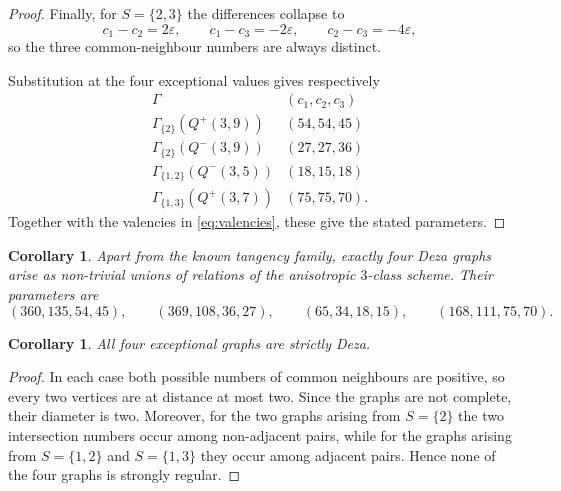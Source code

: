 \documentclass{article}
\theoremstyle{plain}
\newtheorem{cor}[thm]{Corollary}
\newtheorem{rem}[thm]{Remark}
\begin{document}
\begin{proof}
Finally, for $S=\{2,3\}$ the differences collapse to
\[
 c_1-c_2=2\varepsilon,\qquad
 c_1-c_3=-2\varepsilon,\qquad
 c_2-c_3=-4\varepsilon,
\]
so the three common-neighbour numbers are always distinct.

Substitution at the four exceptional values gives respectively
\[
\begin{array}{c|c}
\Gamma & (c_1,c_2,c_3)\\
\hline
\Gamma_{\{2\}}(Q^+(3,9)) & (54,54,45)\\
\Gamma_{\{2\}}(Q^-(3,9)) & (27,27,36)\\
\Gamma_{\{1,2\}}(Q^-(3,5)) & (18,15,18)\\
\Gamma_{\{1,3\}}(Q^+(3,7)) & (75,75,70).
\end{array}
\]
Together with the valencies in \eqref{eq:valencies}, these give the stated parameters. 

\end{proof}

\begin{cor}
Apart from the known tangency family, exactly four Deza graphs arise
as non-trivial unions of relations of the anisotropic $3$-class scheme.
Their parameters are
\[
(360,135,54,45),\qquad
(369,108,36,27),\qquad
(65,34,18,15),\qquad
(168,111,75,70).
\]
\end{cor}

\begin{cor}
All four exceptional graphs are strictly Deza.
\end{cor}

\begin{proof}
In each case both possible numbers of common neighbours are positive, so every two vertices are at distance at most two. Since the graphs are not complete, their diameter is two. Moreover, for the two graphs arising from $S=\{2\}$ the two intersection numbers occur among non-adjacent pairs, while for the graphs arising from $S=\{1,2\}$ and $S=\{1,3\}$ they occur among adjacent pairs. Hence none of the four graphs is strongly regular.
\end{proof}
\end{document}
